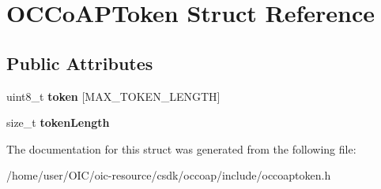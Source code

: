 \hypertarget{structOCCoAPToken}{}\section{O\+C\+Co\+A\+P\+Token Struct Reference}
\label{structOCCoAPToken}
\subsection*{Public Attributes}
\begin{DoxyCompactItemize}
\item 
\hypertarget{structOCCoAPToken_a4865c6acfd4790ffc42243ad2351d622}{}uint8\+\_\+t {\bfseries token} \mbox{[}M\+A\+X\+\_\+\+T\+O\+K\+E\+N\+\_\+\+L\+E\+N\+G\+T\+H\mbox{]}\label{structOCCoAPToken_a4865c6acfd4790ffc42243ad2351d622}

\item 
\hypertarget{structOCCoAPToken_a31bca1c8ec03abd13f8984a101e72b64}{}size\+\_\+t {\bfseries token\+Length}\label{structOCCoAPToken_a31bca1c8ec03abd13f8984a101e72b64}

\end{DoxyCompactItemize}


The documentation for this struct was generated from the following file\+:\begin{DoxyCompactItemize}
\item 
/home/user/\+O\+I\+C/oic-\/resource/csdk/occoap/include/occoaptoken.\+h\end{DoxyCompactItemize}
